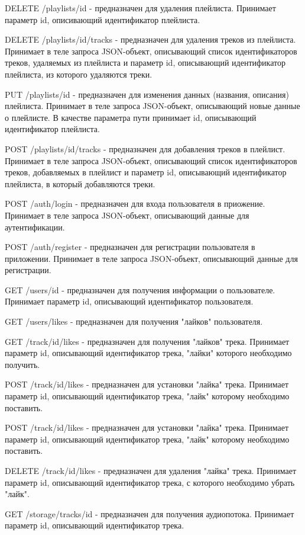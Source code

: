 DELETE /playlists/{id} - предназначен для удаления плейлиста. Принимает параметр id, описивающий идентификатор плейлиста.

DELETE /playlists/{id}/tracks - предназначен для удаления треков из плейлиста. Принимает в теле запроса JSON-объект, описывающий список идентификаторов треков, удаляемых из плейлиста и параметр id, описывающий идентификатор плейлиста, из которого удаляются треки. 

PUT /playlists/{id} - предназначен для изменения данных (названия, описания) плейлиста. Принимает в теле запроса JSON-объект, описывающий новые данные о плейлисте. В качестве параметра пути принимает id, описывающий идентификатор плейлиста.

POST /playlists/{id}/tracks - предназначен для добавления треков в плейлист. Принимает в теле запроса JSON-объект, описывающий список идентификаторов треков, добавляемых в плейлист и параметр id, описывающий идентификатор плейлиста, в который добавляются треки. 

POST /auth/login - предназначен для входа пользователя в приожение. Принимает в теле запроса JSON-объект, описывающий данные для аутентификации.

POST /auth/register - предназначен для регистрации пользователя в приложении.  Принимает в теле запроса JSON-объект, описывающий данные для регистрации.

GET /users/{id} - предназначен для получения информации о пользователе. Принимает параметр id, описывающий идентификатор пользователя.

GET /users/likes - предназначен для получения "лайков" пользователя.

GET /track/{id}/likes - предназначен для получения "лайков" трека. Принимает параметр id, описывающий идентификатор трека, "лайки" которого необходимо получить.

POST /track/{id}/likes - предназначен для установки "лайка" трека. Принимает параметр id, описывающий идентификатор трека, "лайк" которому необходимо поставить.

POST /track/{id}/likes - предназначен для установки "лайка" трека. Принимает параметр id, описывающий идентификатор трека, "лайк" которому необходимо поставить.

DELETE /track/{id}/likes - предназначен для удаления "лайка" трека. Принимает параметр id, описывающий идентификатор трека, с которого необходимо убрать "лайк".

GET /storage/tracks/{id} - предназначен для получения аудиопотока. Принимает параметр id, описывающий идентификатор трека.

